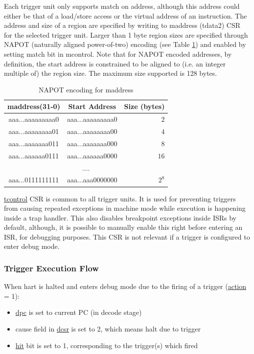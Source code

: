 \documentclass[main\_\_EN.tex]{subfiles}
\begin{document}
Each trigger unit only supports match on address, although this address could either be that of a load/store access or the virtual address of an instruction. The address and size of a region are specified by writing to maddress (tdata2) CSR for the selected trigger unit. Larger than 1 byte region sizes are specified through NAPOT (naturally aligned power-of-two) encoding (see Table \ref{tab:riscvcpu-hwt-table}) and enabled by setting match bit in mcontrol. Note that for NAPOT encoded addresses, by definition, the start address is constrained to be aligned to (i.e. an integer multiple of) the region size. The maximum size supported is 128 bytes.

\begin{longtable}{ | c | c | r | }
\caption{NAPOT encoding for maddress} \label{tab:riscvcpu-hwt-table}
\\ \hline
\rowcolor{lightgray}
maddress(31-0) & Start Address & Size (bytes) \\ \hline
aaa...aaaaaaaaa0 & aaa...aaaaaaaaa0 & $2$ \\ \hline
aaa...aaaaaaaa01 & aaa...aaaaaaaa00 & $4$ \\ \hline
aaa...aaaaaaa011 & aaa...aaaaaaa000 & $8$ \\ \hline
aaa...aaaaaa0111 & aaa...aaaaaa0000 & $16$ \\ \hline
\multicolumn{3}{c}{....} \\ \hline
aaa...0111111111 & aaa...aaa0000000 & $2^{8}$ \\ \hline
\end{longtable}

\hyperref[regdesc:TCONTROL]{tcontrol} CSR is common to all trigger units. It is used for preventing triggers from causing repeated exceptions in machine mode while execution is happening inside a trap handler. This also disables breakpoint exceptions inside ISRs by default, although, it is possible to manually enable this right before entering an ISR, for debugging purposes. This CSR is not relevant if a trigger is configured to enter debug mode.

\subsubsection{Trigger Execution Flow}
\label{sec:riscvcpu-hwt-suggest-op}

When hart is halted and enters debug mode due to the firing of a trigger (\hyperref[fielddesc:MCONTROLACTION]{action} = 1):
\begin{itemize}
    \item \hyperref[regdesc:DPC]{dpc} is set to current PC (in decode stage)
    \item cause field in \hyperref[regdesc:DCSR]{dcsr} is set to 2, which means halt due to trigger
    \item \hyperref[fielddesc:MCONTROLHIT]{hit} bit is set to 1, corresponding to the trigger(s) which fired
\end{itemize}
\end{document}
